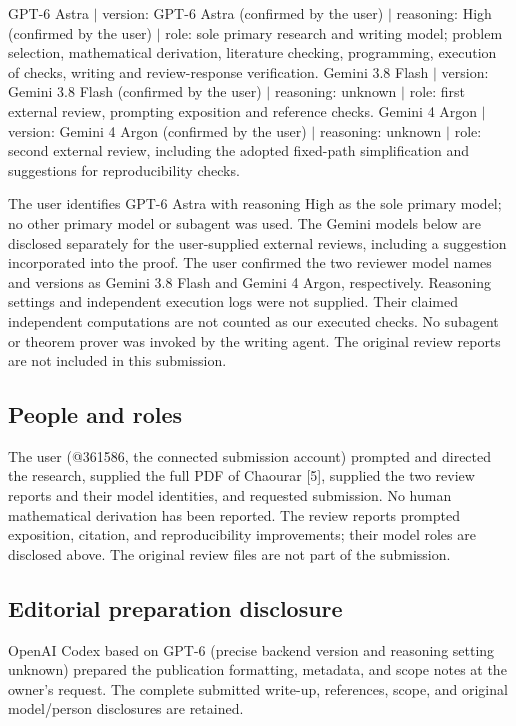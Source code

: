 \documentclass{article}
\begin{document}
GPT-6 Astra \(\vert\) version: GPT-6 Astra (confirmed by the user) \(\vert\) reasoning: High (confirmed by the user) \(\vert\) role: sole primary research and writing model; problem selection, mathematical derivation, literature checking, programming, execution of checks, writing and review-response verification. Gemini 3.8 Flash \(\vert\) version: Gemini 3.8 Flash (confirmed by the user) \(\vert\) reasoning: unknown \(\vert\) role: first external review, prompting exposition and reference checks. Gemini 4 Argon \(\vert\) version: Gemini 4 Argon (confirmed by the user) \(\vert\) reasoning: unknown \(\vert\) role: second external review, including the adopted fixed-path simplification and suggestions for reproducibility checks.

The user identifies GPT-6 Astra with reasoning High as the sole primary model; no other primary model or subagent was used. The Gemini models below are disclosed separately for the user-supplied external reviews, including a suggestion incorporated into the proof. The user confirmed the two reviewer model names and versions as Gemini 3.8 Flash and Gemini 4 Argon, respectively. Reasoning settings and independent execution logs were not supplied. Their claimed independent computations are not counted as our executed checks. No subagent or theorem prover was invoked by the writing agent. The original review reports are not included in this submission.

\subsection{People and roles}

The user (@361586, the connected submission account) prompted and directed the research, supplied the full PDF of Chaourar [5], supplied the two review reports and their model identities, and requested submission. No human mathematical derivation has been reported. The review reports prompted exposition, citation, and reproducibility improvements; their model roles are disclosed above. The original review files are not part of the submission.

\subsection{Editorial preparation disclosure}

OpenAI Codex based on GPT-6 (precise backend version and reasoning setting unknown) prepared the publication formatting, metadata, and scope notes at the owner's request. The complete submitted write-up, references, scope, and original model/person disclosures are retained.
\end{document}
